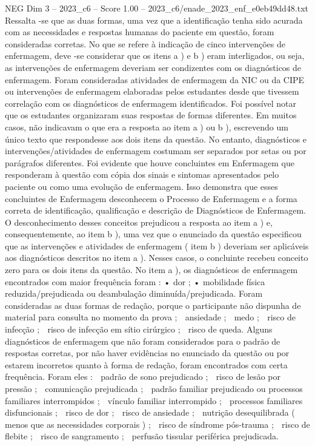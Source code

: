 \begin{textsample}{NEG Dim 3 – 2023\_c6 – Score 1.00 – 2023\_c6/enade\_2023\_enf\_e0eb49dd48.txt}
Ressalta -se que as duas formas, uma vez que a identificação tenha sido acurada com as necessidades e respostas humanas do paciente em questão, foram consideradas corretas.
No que se refere à indicação de cinco intervenções de enfermagem, deve -se considerar que os itens a ) e b ) eram interligados, ou seja, as intervenções de enfermagem deveriam ser condizentes com os diagnósticos de enfermagem.
Foram consideradas atividades de enfermagem da NIC ou da CIPE ou intervenções de enfermagem elaboradas pelos estudantes desde que tivessem correlação com os diagnósticos de enfermagem identificados.
Foi possível notar que os estudantes organizaram suas respostas de formas diferentes.
Em muitos casos, não indicavam o que era a resposta ao item a ) ou b ), escrevendo um único texto que respondesse aos dois itens da questão.
No entanto, diagnósticos e intervenções/atividades de enfermagem costumam ser separados por setas ou por parágrafos diferentes.
Foi evidente que houve concluintes em Enfermagem que responderam à questão com cópia dos sinais e sintomas apresentados pelo paciente ou como uma evolução de enfermagem.
Isso demonstra que esses concluintes de Enfermagem desconhecem o Processo de Enfermagem e a forma correta de identificação, qualificação e descrição de Diagnósticos de Enfermagem.
O desconhecimento desses conceitos prejudicou a resposta ao item a ) e, consequentemente, ao item b ), uma vez que o enunciado da questão especificou que as intervenções e atividades de enfermagem ( item b ) deveriam ser aplicáveis aos diagnósticos descritos no item a ).
Nesses casos, o concluinte recebeu conceito zero para os dois itens da questão.
No item a ), os diagnósticos de enfermagem encontrados com maior frequência foram : • dor ; • mobilidade física reduzida/prejudicada ou deambulação diminuída/prejudicada.
Foram consideradas as duas formas de redação, porque o participante não dispunha de material para consulta no momento da prova ;  ansiedade ;  medo ;  risco de infecção ;  risco de infecção em sítio cirúrgico ;  risco de queda.
Alguns diagnósticos de enfermagem que não foram considerados para o padrão de respostas corretas, por não haver evidências no enunciado da questão ou por estarem incorretos quanto à forma de redação, foram encontrados com certa frequência.
Foram eles :  padrão de sono prejudicado ;  risco de lesão por pressão ;  comunicação prejudicada ;  padrão familiar prejudicado ou processos familiares interrompidos ;  vínculo familiar interrompido ;  processos familiares disfuncionais ;  risco de dor ;  risco de ansiedade ;  nutrição desequilibrada ( menos que as necessidades corporais ) ;  risco de síndrome pós-trauma ;  risco de flebite ;  risco de sangramento ;  perfusão tissular periférica prejudicada.

\end{textsample}
